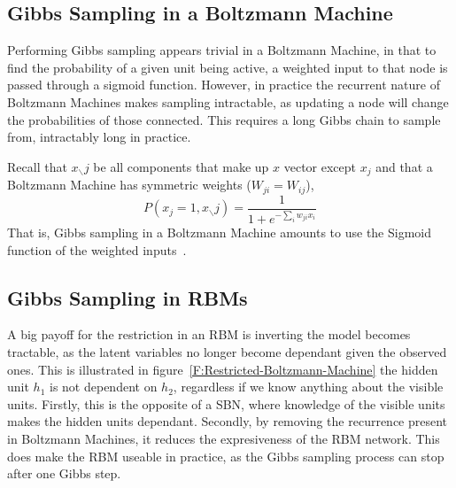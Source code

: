 \subsection{Gibbs Sampling in a Boltzmann Machine}

Performing Gibbs sampling appears trivial in a Boltzmann Machine, in that to find the probability of a given unit being active, a weighted input to that node is passed through a sigmoid function. However, in practice the recurrent nature of Boltzmann Machines makes sampling intractable, as updating a node will change the probabilities of those connected. This requires a long Gibbs chain to sample from, intractably long in practice.

Recall that $ x_{\smallsetminus} j$ be all components that make up $x$ vector except $x_j$ and that a Boltzmann Machine has symmetric weights ($ W_{ji} = W_{ij} $),
$$
P(x_j = 1, x_{\smallsetminus}j) = \frac{1}{1 + e^{-\sum_i w_{ji}x_i}}
$$
That is, Gibbs sampling in a Boltzmann Machine amounts to use the Sigmoid function of the weighted inputs~\cite{neal1992:connectionist}.

\subsection{Gibbs Sampling in RBMs}



A big payoff for the restriction in an RBM is inverting the model becomes tractable, as the latent variables no longer become dependant given the observed ones. This is illustrated in figure~\ref{F:Restricted-Boltzmann-Machine} the hidden unit $h_1$ is not dependent on $h_2$, regardless if we know anything about the visible units. Firstly, this is the opposite of a SBN, where knowledge of the visible units makes the hidden units dependant. Secondly, by removing the recurrence present in Boltzmann Machines, it reduces the expresiveness of the RBM network. This does make the RBM useable in practice, as the Gibbs sampling process can stop after one Gibbs step\cite{fischer2014training}.

